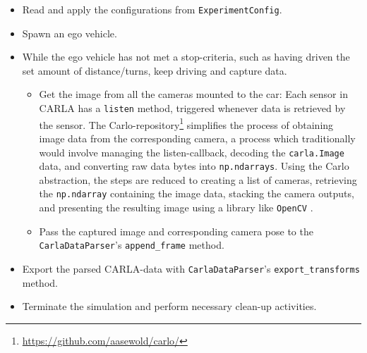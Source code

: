 \begin{itemize}
    \item Read and apply the configurations from \texttt{ExperimentConfig}.
    \item Spawn an ego vehicle.
    \item While the ego vehicle has not met a stop-criteria, such as having driven the set amount of distance/turns, keep driving and capture data.
    \begin{itemize}
        \item Get the image from all the cameras mounted to the car: Each sensor in CARLA has a \texttt{listen} method, triggered whenever data is retrieved by the sensor. The Carlo-repository\footnote{\url{https://github.com/aasewold/carlo/}} simplifies the process of obtaining image data from the corresponding camera, a process which traditionally would involve managing the listen-callback, decoding the \texttt{carla.Image} data, and converting raw data bytes into \texttt{np.ndarrays}. Using the Carlo abstraction, the steps are reduced to creating a list of cameras, retrieving the \texttt{np.ndarray} containing the image data, stacking the camera outputs, and presenting the resulting image using a library like \texttt{OpenCV} \cite{opencv_library}.
        \item Pass the captured image and corresponding camera pose to the \texttt{CarlaDataParser}'s \texttt{append\_frame} method.
    \end{itemize}
    \item Export the parsed CARLA-data with \texttt{CarlaDataParser}'s \texttt{export\_transforms} method.
    \item Terminate the simulation and perform necessary clean-up activities.
\end{itemize}


